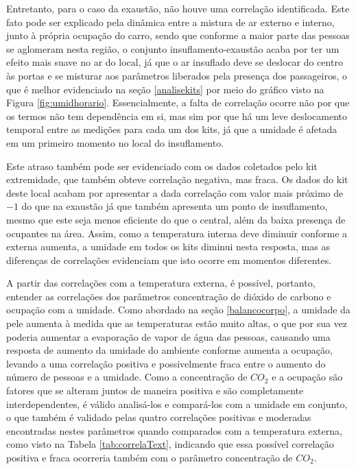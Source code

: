 \documentclass[acronym,symbols,table]{fei}
\begin{document}
Entretanto, para o caso da exaustão, não houve uma correlação identificada. Este fato pode ser explicado pela dinâmica entre a mistura de ar externo e interno, junto à própria ocupação do carro, sendo que conforme a maior parte das pessoas se aglomeram nesta região, o conjunto insuflamento-exaustão acaba por ter um efeito mais suave no ar do local, já que o ar insuflado deve se deslocar do centro às portas e se misturar aos parâmetros liberados pela presença dos passageiros, o que é melhor evidenciado na seção \ref{analisekits} por meio do gráfico visto na Figura \ref{fig:umidhorario}. Essencialmente, a falta de correlação ocorre não por que os termos não tem dependência em si, mas sim por que há um leve deslocamento temporal entre as medições para cada um dos kits, já que a umidade é afetada em um primeiro momento no local do insuflamento.

Este atraso também pode ser evidenciado com os dados coletados pelo kit extremidade, que também obteve correlação negativa, mas fraca. Os dados do kit deste local acabam por apresentar a dada correlação com valor mais próximo de $-1$ do que na exaustão já que também apresenta um ponto de insuflamento, mesmo que este seja menos eficiente do que o central, além da baixa presença de ocupantes na área. Assim, como a temperatura interna deve diminuir conforme a externa aumenta, a umidade em todos os kits diminui nesta resposta, mas as diferenças de correlações evidenciam que isto ocorre em momentos diferentes.

A partir das correlações com a temperatura externa, é possível, portanto, entender as correlações dos parâmetros concentração de dióxido de carbono e ocupação com a umidade. Como abordado na seção \ref{balancocorpo}, a umidade da pele aumenta à medida que as temperaturas estão muito altas, o que por sua vez poderia aumentar a evaporação de vapor de água das pessoas, causando uma resposta de aumento da umidade do ambiente conforme aumenta a ocupação, levando a uma correlação positiva e possivelmente fraca entre o aumento do número de pessoas e a umidade. Como a concentração de ${CO}_{2}$ e a ocupação são fatores que se alteram juntos de maneira positiva e são completamente interdependentes, é válido analisá-los e compará-los com a umidade em conjunto, o que também é validado pelas quatro correlações positivas e moderadas encontradas nestes parâmetros quando comparados com a temperatura externa, como visto na Tabela \ref{tab:correlaText}, indicando que essa possível correlação positiva e fraca ocorreria também com o parâmetro concentração de ${CO}_{2}$.
\end{document}
